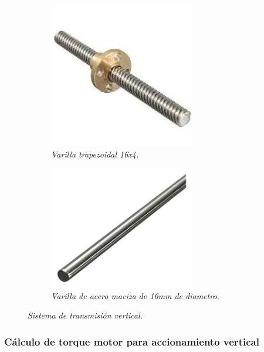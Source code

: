 \begin{figure}[H]
    \centering
    \begin{subfigure}{0.35\textwidth}
        \centering
        \includegraphics[width=0.7\textwidth]{img/v_roscada.png}
        \caption{\textit{Varilla trapezoidal 16x4.}}
        \label{fig:v_roscada}
    \end{subfigure}
    \hspace{0.5cm}
    \begin{subfigure}{0.35\textwidth}
        \centering
        \includegraphics[width=0.7\textwidth]{img/varilla lisa.png}
        \caption{\textit{Varilla de acero maciza de 16mm de diametro.}}
        \label{fig:varilla lisa}
    \end{subfigure}
    \caption{\textit{Sistema de transmisión vertical.}}
\end{figure}


\subsubsection{Cálculo de torque motor para accionamiento vertical}

